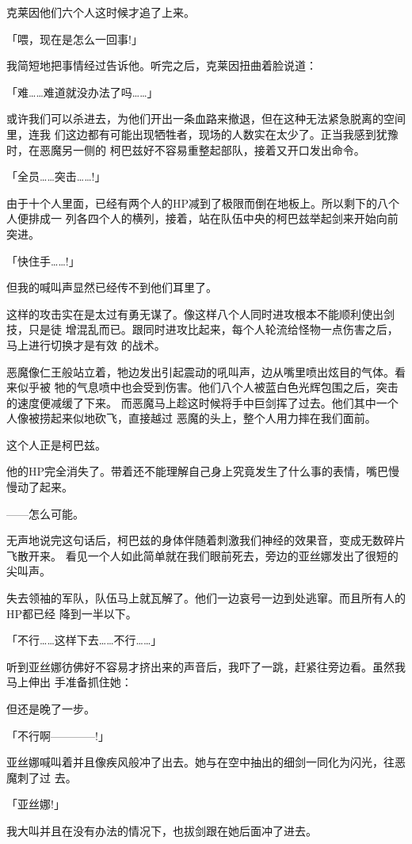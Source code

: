 \documentclass[11pt]{book}
\begin{document}
克莱因他们六个人这时候才追了上来。

「喂，现在是怎么一回事!」

我简短地把事情经过告诉他。听完之后，克莱因扭曲着脸说道：

「难……难道就没办法了吗……」

或许我们可以杀进去，为他们开出一条血路来撤退，但在这种无法紧急脱离的空间里，连我
们这边都有可能出现牺牲者，现场的人数实在太少了。正当我感到犹豫时，在恶魔另一侧的
柯巴兹好不容易重整起部队，接着又开口发出命令。

「全员……突击……!」

由于十个人里面，已经有两个人的HP减到了极限而倒在地板上。所以剩下的八个人便排成一
列各四个人的横列，接着，站在队伍中央的柯巴兹举起剑来开始向前突进。

「快住手……!」

但我的喊叫声显然已经传不到他们耳里了。

这样的攻击实在是太过有勇无谋了。像这样八个人同时进攻根本不能顺利使出剑技，只是徒
增混乱而已。跟同时进攻比起来，每个人轮流给怪物一点伤害之后，马上进行切换才是有效
的战术。

恶魔像仁王般站立着，牠边发出引起震动的吼叫声，边从嘴里喷出炫目的气体。看来似乎被
牠的气息喷中也会受到伤害。他们八个人被蓝白色光辉包围之后，突击的速度便减缓了下来。
而恶魔马上趁这时候将手中巨剑挥了过去。他们其中一个人像被捞起来似地砍飞，直接越过
恶魔的头上，整个人用力摔在我们面前。

这个人正是柯巴兹。

他的HP完全消失了。带着还不能理解自己身上究竟发生了什么事的表情，嘴巴慢慢动了起来。

——怎么可能。

无声地说完这句话后，柯巴兹的身体伴随着刺激我们神经的效果音，变成无数碎片飞散开来。
看见一个人如此简单就在我们眼前死去，旁边的亚丝娜发出了很短的尖叫声。

失去领袖的军队，队伍马上就瓦解了。他们一边哀号一边到处逃窜。而且所有人的HP都已经
降到一半以下。

「不行……这样下去……不行……」

听到亚丝娜彷佛好不容易才挤出来的声音后，我吓了一跳，赶紧往旁边看。虽然我马上伸出
手准备抓住她：

但还是晚了一步。

「不行啊————!」

亚丝娜喊叫着并且像疾风般冲了出去。她与在空中抽出的细剑一同化为闪光，往恶魔刺了过
去。

「亚丝娜!」

我大叫并且在没有办法的情况下，也拔剑跟在她后面冲了进去。
\end{document}
